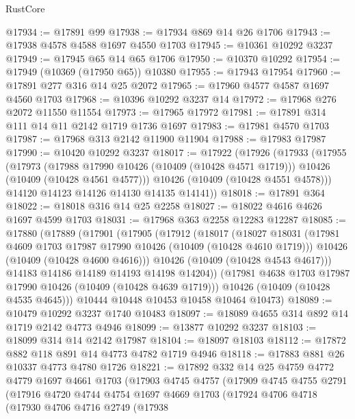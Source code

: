 \begin{lexlean}{RustCore}
\begin{coremodule}
@17934 := @17891 @99
@17938 := @17934 @869 @14 @26 @1706
@17943 := @17938 @4578 @4588 @1697 @4550 @1703
@17945 := @10361 @10292 @3237
@17949 := @17945 @65 @14 @65 @1706
@17950 := @10370 @10292
@17954 := @17949 (@10369 (@17950 @65)) @10380
@17955 := @17943 @17954
@17960 := @17891 @277 @316 @14 @25 @2072
@17965 := @17960 @4577 @4587 @1697 @4560 @1703
@17968 := @10396 @10292 @3237 @14
@17972 := @17968 @276 @2072 @11550 @11554
@17973 := @17965 @17972
@17981 := @17891 @314 @111 @14 @11 @2142 @1719 @1736 @1697
@17983 := @17981 @4570 @1703
@17987 := @17968 @313 @2142 @11900 @11904
@17988 := @17983 @17987
@17990 := @10420 @10292 @3237
@18017 := @17922
    (@17926
      (@17933
        (@17955
          (@17973
            (@17988 @17990 @10426 (@10409 (@10428 @4571 @1719)))
            @10426
            (@10409 (@10428 @4561 @4577)))
          @10426
          (@10409 (@10428 @4551 @4578)))
        @14120
        @14123
        @14126
        @14130
        @14135
        @14141))
@18018 := @17891 @364
@18022 := @18018 @316 @14 @25 @2258
@18027 := @18022 @4616 @4626 @1697 @4599 @1703
@18031 := @17968 @363 @2258 @12283 @12287
@18085 := @17880
    (@17889
      (@17901
        (@17905
          (@17912
            (@18017
              (@18027
                @18031
                (@17981 @4609 @1703 @17987 @17990 @10426 (@10409 (@10428 @4610 @1719)))
                @10426
                (@10409 (@10428 @4600 @4616)))
              @10426
              (@10409 (@10428 @4543 @4617)))
            @14183
            @14186
            @14189
            @14193
            @14198
            @14204))
        (@17981 @4638 @1703 @17987 @17990 @10426 (@10409 (@10428 @4639 @1719)))
        @10426
        (@10409 (@10428 @4535 @4645)))
      @10444
      @10448
      @10453
      @10458
      @10464
      @10473)
@18089 := @10479 @10292 @3237 @1740 @10483
@18097 := @18089 @4655 @314 @892 @14 @1719 @2142 @4773 @4946
@18099 := @13877 @10292 @3237
@18103 := @18099 @314 @14 @2142 @17987
@18104 := @18097 @18103
@18112 := @17872 @882 @118 @891 @14 @4773 @4782 @1719 @4946
@18118 := @17883 @881 @26 @10337 @4773 @4780 @1726
@18221 := @17892
    @332
    @14
    @25
    @4759
    @4772
    @4779
    @1697
    @4661
    @1703
    (@17903
      @4745
      @4757
      (@17909
        @4745
        @4755
        @2791
        (@17916
          @4720
          @4744
          @4754
          @1697
          @4669
          @1703
          (@17924
            @4706
            @4718
            (@17930
              @4706
              @4716
              @2749
              (@17938

\end{coremodule}
\end{lexlean}
